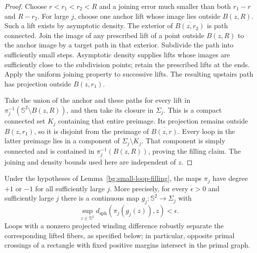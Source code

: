 \begin{proof}
Choose $r<r_1<r_2<R$ and a joining error much smaller than both
$r_1-r$ and $R-r_2$. For large $j$, choose one anchor lift whose
image lies outside $B(z,R)$. Such a lift exists by asymptotic density.
The exterior of $\overline{B(z,r_2)}$ is path connected. Join the
image of any prescribed lift of a point outside $B(z,R)$ to the
anchor image by a target path in that exterior. Subdivide the path
into sufficiently small steps. Asymptotic density supplies lifts
whose images are sufficiently close to the subdivision points;
retain the prescribed lifts at the ends. Apply the uniform joining
property to successive lifts. The resulting upstairs path has
projection outside $\overline{B(z,r_1)}$.

Take the union of the anchor and these paths for every lift in
$\pi_j^{-1}(\mathbb S^2\setminus B(z,R))$, and then take its closure
in $\Sigma_j$. This is a compact connected set $K_j$ containing
that entire preimage. Its projection remains outside $B(z,r_1)$,
so it is disjoint from the preimage of $\overline{B(z,r)}$.
Every loop in the latter preimage lies in a component of
$\Sigma_j\setminus K_j$. That component is simply connected and
is contained in $\pi_j^{-1}(B(z,R))$, proving the filling claim.
The joining and density bounds used here are independent of $z$.
\end{proof}

\begin{proposition}
\label{bg:projection-topology}
Under the hypotheses of Lemma~\ref{bg:small-loop-filling}, the maps
$\pi_j$ have degree $+1$ or $-1$ for all sufficiently large $j$.
More precisely, for every $\epsilon>0$ and sufficiently large $j$
there is a continuous map $g_j:\mathbb S^2\to\Sigma_j$ with
\[
 \sup_{z\in\mathbb S^2}
 d_{\mathrm{sph}}(\pi_j(g_j(z)),z)<\epsilon.
\]
Loops with a nonzero projected winding difference robustly separate
the corresponding lifted fibers, as specified below; in particular,
opposite primal crossings of a rectangle with fixed positive margins
intersect in the primal graph.
\end{proposition}

